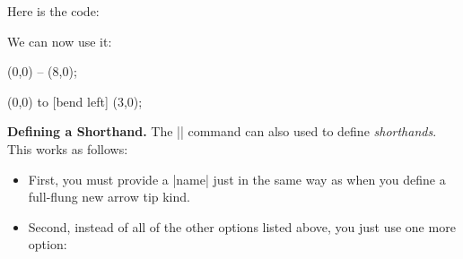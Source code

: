 \begin{command}{\pgfdeclarearrow{}}
    Here is the code:
\begin{codeexample}
\end{codeexample}
    We can now use it:
\begin{codeexample}[]
\tikz \draw [-foo] (0,0) -- (8,0);
\end{codeexample}
\begin{codeexample}[]
\tikz \draw [-{foo[length=2cm,bend]}] (0,0) to [bend left] (3,0);
\end{codeexample}


    \medskip
    \noindent\textbf{Defining a Shorthand.}
    The |\pgfdeclarearrow| command can also used to define
    \emph{shorthands}. This works as follows:
    \begin{itemize}
        \item First, you must provide a |name| just in the same way as when you
            define a full-flung new arrow tip kind.
        \item Second, instead of all of the other options listed above, you
            just use one more option:


\end{itemize}
\end{command}
